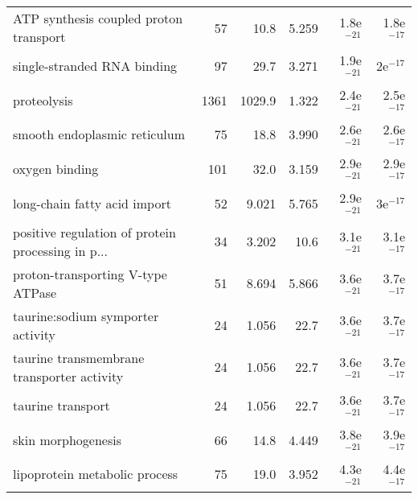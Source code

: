 \begin{longtable}{lrrrrr}
            ATP synthesis coupled proton transport &                      57 &                    10.8 &      5.259 &         1.8e$^{-21}$ &         1.8e$^{-17}$ \\
                       single-stranded RNA binding &                      97 &                    29.7 &      3.271 &         1.9e$^{-21}$ &           2e$^{-17}$ \\
                                       proteolysis &                    1361 &                  1029.9 &      1.322 &         2.4e$^{-21}$ &         2.5e$^{-17}$ \\
                      smooth endoplasmic reticulum &                      75 &                    18.8 &      3.990 &         2.6e$^{-21}$ &         2.6e$^{-17}$ \\
                                    oxygen binding &                     101 &                    32.0 &      3.159 &         2.9e$^{-21}$ &         2.9e$^{-17}$ \\
                      long-chain fatty acid import &                      52 &                   9.021 &      5.765 &         2.9e$^{-21}$ &           3e$^{-17}$ \\
 positive regulation of protein processing in p... &                      34 &                   3.202 &       10.6 &         3.1e$^{-21}$ &         3.1e$^{-17}$ \\
                 proton-transporting V-type ATPase &                      51 &                   8.694 &      5.866 &         3.6e$^{-21}$ &         3.7e$^{-17}$ \\
                 taurine:sodium symporter activity &                      24 &                   1.056 &       22.7 &         3.6e$^{-21}$ &         3.7e$^{-17}$ \\
        taurine transmembrane transporter activity &                      24 &                   1.056 &       22.7 &         3.6e$^{-21}$ &         3.7e$^{-17}$ \\
                                 taurine transport &                      24 &                   1.056 &       22.7 &         3.6e$^{-21}$ &         3.7e$^{-17}$ \\
                                skin morphogenesis &                      66 &                    14.8 &      4.449 &         3.8e$^{-21}$ &         3.9e$^{-17}$ \\
                     lipoprotein metabolic process &                      75 &                    19.0 &      3.952 &         4.3e$^{-21}$ &         4.4e$^{-17}$ \\

\end{longtable}
